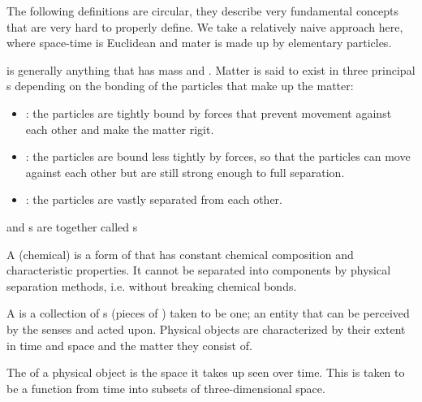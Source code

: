 \begin{module}[id=physobj]

\begin{omtext}
  The following definitions are circular, they describe very fundamental concepts that
  are very hard to properly define. We take a relatively naive approach here, where
  space-time is Euclidean and mater is made up by elementary particles.
\end{omtext}

\begin{definition}
   is generally anything that has mass and . Matter is
  said to exist in three principal s depending on the bonding of the particles
  that make up the matter:
  \begin{itemize}
  \item {}: the particles are tightly bound by forces that prevent movement
    against each other and make the matter rigit. 
  \item {}: the particles are bound less tightly by forces, so that the
    particles can move against each other but are still strong enough to full separation. 
  \item {}: the particles are vastly separated from each other.
  \end{itemize}
\end{definition}

\begin{definition}
   and s are together called s
\end{definition}

\begin{definition}
  A (chemical)  is a form of  that has constant chemical
  composition and characteristic properties.  It cannot be separated into components by
  physical separation methods, i.e. without breaking chemical bonds.
\end{definition}

\begin{definition}
  A  is a collection of s (pieces of
  ) taken to be one; an entity that can be perceived by the senses and acted
  upon. Physical objects are characterized by their extent in time and space and the
  matter they consist of.
\end{definition}

\begin{definition}
  The  of a physical object is the space it takes up seen over time. This is
  taken to be a function from time into subsets of three-dimensional space.
\end{definition}


\end{module}
